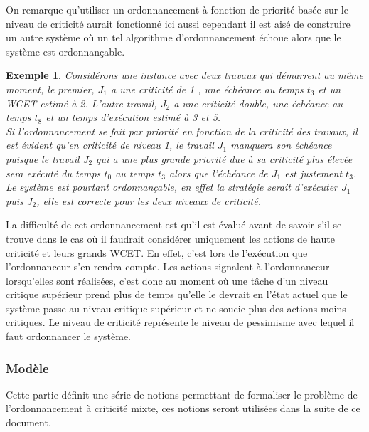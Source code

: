 \documentclass[11pt,a4paper,oneside]{book}
\theoremstyle{break}
\newtheorem{exem}{Exemple}
\theoremstyle{breakplain}
\begin{document}
On remarque qu'utiliser un ordonnancement à fonction de priorité basée sur le niveau de criticité aurait fonctionné ici aussi cependant il est aisé de construire un autre système où un tel algorithme d'ordonnancement échoue alors que le système est ordonnançable.

\begin{exem}
Considérons une instance avec deux travaux qui démarrent au même moment, le premier, $J_1$ a une criticité de 1 , une échéance au temps $t_3$ et un WCET estimé à 2. L'autre travail, $J_2$ a une criticité double, une échéance au temps $t_8$ et un temps d'exécution estimé à 3 et 5.\\
Si l'ordonnancement se fait par priorité en fonction de la criticité des travaux, il est évident qu'en criticité de niveau 1, le travail $J_1$ manquera son échéance puisque le travail $J_2$ qui a une plus grande priorité due à sa criticité plus élevée sera exécuté du temps $t_0$ au temps $t_3$ alors que l'échéance de $J_1$ est justement $t_3$.\\
Le système est pourtant ordonnançable, en effet la stratégie serait d'exécuter $J_1$ puis $J_2$, elle est correcte pour les deux niveaux de criticité.
\end{exem}

La difficulté de cet ordonnancement est qu'il est évalué avant de savoir s'il se trouve dans le cas où il faudrait considérer uniquement les actions de haute criticité et leurs grands WCET. En effet, c'est lors de l'exécution que l'ordonnanceur s'en rendra compte. Les actions signalent à l'ordonnanceur lorsqu'elles sont réalisées, c'est donc au moment où une tâche d'un niveau critique supérieur prend plus de temps qu'elle le devrait en l'état actuel que le système passe au niveau critique supérieur et ne soucie plus des actions moins critiques. Le niveau de criticité représente le niveau de pessimisme avec lequel il faut ordonnancer le système. 

\subsubsection{Modèle}
Cette partie définit une série de notions permettant de formaliser le problème de l'ordonnancement à criticité mixte, ces notions seront utilisées dans la suite de ce document.
\end{document}
